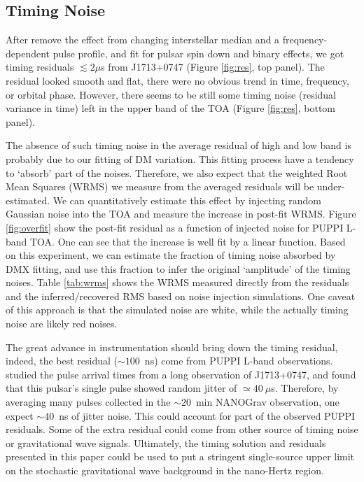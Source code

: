 \subsection{Timing Noise}
\label{sec:noise}
After remove the effect from changing interstellar median and a
frequency-dependent pulse profile, and fit for pulsar spin down and binary
effects, we got timing residuals $\lesssim 2\mu$s from J1713+0747 (Figure
\ref{fig:res}, top panel).
The residual looked smooth and flat, there were no obvious trend in time,
frequency, or orbital phase.
However, there seems to be still some timing noise (residual variance in time)
left in the upper band of the TOA (Figure \ref{fig:res}, bottom panel).

The absence of such timing noise in the average residual of high and low band is probably due to
our fitting of DM variation. 
This fitting process have a tendency to `absorb' part of the noises.
Therefore, we also expect that the weighted Root Mean Squares (WRMS) we measure from the
averaged residuals will be under-estimated. We can quantitatively
estimate this effect by injecting random Gaussian noise into the TOA and
measure the increase in post-fit WRMS. Figure \ref{fig:overfit} show
the post-fit residual as a function of injected noise for PUPPI L-band TOA. 
One can see that the increase is well fit by a linear function. 
Based on this experiment, we
can estimate the fraction of timing noise absorbed by DMX fitting, and use
this fraction to infer the original `amplitude' of the timing noises. 
Table \ref{tab:wrms} shows the WRMS measured directly from the
residuals and 
the inferred/recovered RMS based on noise injection simulations. One caveat of this
approach is that the simulated noise are white, while the actually timing
noise are likely red noises. 


The great advance in instrumentation should bring down the timing residual,
indeed, the best residual ($\sim100$~ns) come from PUPPI L-band observations.
\citet{sc12} studied the pulse arrival times from a long observation of
J1713+0747, and found that this pulsar's single pulse showed random jitter of
$\simeq40~\mu$s. Therefore, by averaging many pulses collected in the
$\sim20$~min NANOGrav observation, one expect $\sim 40$~ns of jitter noise. 
This could account for part of the observed PUPPI residuals.
Some of the extra residual could come from other source of timing noise or gravitational wave signals.
Ultimately, the timing solution and residuals presented in this paper could be used to put a stringent single-source upper limit on the stochastic gravitational wave background in the nano-Hertz region.

